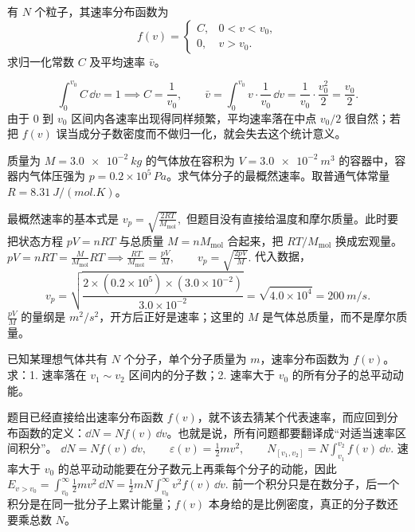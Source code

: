 \documentclass[lang=cn,11pt]{elegantbook}
\begin{document}
\begin{exercise}[分段常数分布函数怎样先归一化再求平均速率]
有 \(N\) 个粒子，其速率分布函数为
\[
f(v)=
\begin{cases}
C,&0<v<v_0,\\
0,&v>v_0.
\end{cases}
\]
求归一化常数 \(C\) 及平均速率 \(\bar v\)。
\end{exercise}
\begin{solution}
\[
\int_0^{v_0}C\,\dd v=1\implies C=\frac1{v_0},\qquad
\bar v=\int_0^{v_0} v\cdot \frac{1}{v_0}\,\dd v
=\frac{1}{v_0}\cdot \frac{v_0^2}{2}
=\frac{v_0}{2}.
\]
由于 \(0\) 到 \(v_0\) 区间内各速率出现得同样频繁，平均速率落在中点 \(v_0/2\) 很自然；若把 \(f(v)\) 误当成分子数密度而不做归一化，就会失去这个统计意义。
\end{solution}


\begin{exercise}
质量为 \(M=\SI{3.0e-2}{kg}\) 的气体放在容积为 \(V=\SI{3.0e-2}{m^3}\) 的容器中，容器内气体压强为 \(p=0.2\times10^5\,\si{Pa}\)。求气体分子的最概然速率。取普通气体常量 \(R=\SI{8.31}{J/(mol.K)}\)。
\end{exercise}

\begin{solution}
最概然速率的基本式是
 \(v_p=\sqrt{\frac{2RT}{M_{\mathrm{mol}}}},\) 
但题目没有直接给温度和摩尔质量。此时要把状态方程 \(pV=nRT\) 与总质量 \(M=nM_{\mathrm{mol}}\) 合起来，把 \(RT/M_{\mathrm{mol}}\) 换成宏观量。
 \(pV=nRT=\frac{M}{M_{\mathrm{mol}}}RT \implies \frac{RT}{M_{\mathrm{mol}}}=\frac{pV}{M},\qquad v_p=\sqrt{\frac{2pV}{M}}.\) 
代入数据，
\[
v_p=\sqrt{\frac{2\times(0.2\times10^5)\times(3.0\times10^{-2})}{3.0\times10^{-2}}}
=\sqrt{4.0\times10^4}
=\SI{200}{m/s}.
\]
\(\frac{pV}{M}\) 的量纲是 \(\si{m^2/s^2}\)，开方后正好是速率；这里的 \(M\) 是气体总质量，而不是摩尔质量。
\end{solution}

\begin{exercise}[已知分布函数时怎样从区间数到总能量]
已知某理想气体共有 \(N\) 个分子，单个分子质量为 \(m\)，速率分布函数为 \(f(v)\)。求：1. 速率落在 \(v_1\sim v_2\) 区间内的分子数；2. 速率大于 \(v_0\) 的所有分子的总平动动能。
\end{exercise}

\begin{solution}
题目已经直接给出速率分布函数 \(f(v)\)，就不该去猜某个代表速率，而应回到分布函数的定义：\(\dd N=Nf(v)\,\dd v\)。也就是说，所有问题都要翻译成“对适当速率区间积分”。
 \(\dd N=Nf(v)\,\dd v,\qquad \varepsilon(v)=\frac12mv^2,\qquad N_{[v_1,v_2]}=N\int_{v_1}^{v_2}f(v)\,\dd v.\) 
速率大于 \(v_0\) 的总平动动能要在分子数元上再乘每个分子的动能，因此
 \(E_{v>v_0} =\int_{v_0}^{\infty}\frac12 mv^2\,\dd N =\frac12 mN\int_{v_0}^{\infty}v^2f(v)\,\dd v.\) 
前一个积分只是在数分子，后一个积分是在同一批分子上累计能量；\(f(v)\) 本身给的是比例密度，真正的分子数还要乘总数 \(N\)。
\end{solution}
\end{document}
